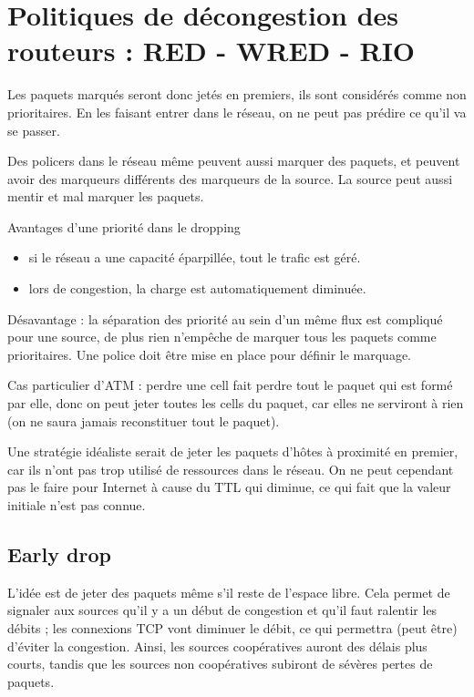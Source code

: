 \chapter{Politiques de décongestion des routeurs : RED - WRED - RIO}

		
		Les paquets marqués seront donc jetés en premiers, ils sont considérés comme non prioritaires. En les faisant entrer dans le réseau, on ne peut pas prédire ce qu'il va se passer.
		
		Des policers dans le réseau même peuvent aussi marquer des paquets, et peuvent avoir des marqueurs différents des marqueurs de la source. La source peut aussi mentir et mal marquer les paquets.
		
		Avantages d'une priorité dans le dropping
		
		\begin{itemize}
			\item si le réseau a une capacité éparpillée, tout le trafic est géré.
			\item lors de congestion, la charge est automatiquement diminuée.
		\end{itemize}
		
		Désavantage : la séparation des priorité au sein d'un même flux est compliqué pour une source, de plus rien n'empêche de marquer tous les paquets comme prioritaires. Une police doit être mise en place pour définir le marquage.
		
		Cas particulier d'ATM : perdre une cell fait perdre tout le paquet qui est formé par elle, donc on peut jeter toutes les cells du paquet, car elles ne serviront à rien (on ne saura jamais reconstituer tout le paquet).
		
		Une stratégie idéaliste serait de jeter les paquets d'hôtes à proximité en premier, car ils n'ont pas trop utilisé de ressources dans le réseau. On ne peut cependant pas le faire pour Internet à cause du TTL qui diminue, ce qui fait que la valeur initiale n'est pas connue.
		
			\section{Early drop}
			
			L'idée est de jeter des paquets même s'il reste de l'espace libre. Cela permet de signaler aux sources qu'il y a un début de congestion et qu'il faut ralentir les débits ; les connexions TCP vont diminuer le débit, ce qui permettra (peut être) d'éviter la congestion. Ainsi, les sources coopératives auront des délais plus courts, tandis que les sources non coopératives subiront de sévères pertes de paquets.
						
